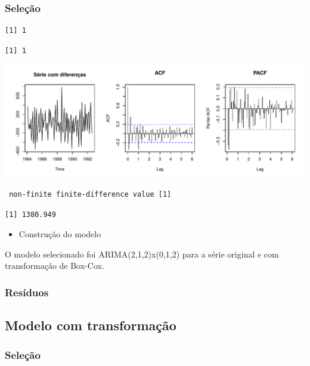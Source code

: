 \documentclass[
  letterpaper,
  DIV=11,
  numbers=noendperiod]{scrartcl}
\providecommand{\tightlist}{%
  \setlength{\itemsep}{0pt}\setlength{\parskip}{0pt}}\usepackage{longtable,booktabs,array}
\begin{document}
\hypertarget{seleuxe7uxe3o}{%
\subsubsection{Seleção}\label{seleuxe7uxe3o}}

\begin{verbatim}
[1] 1
\end{verbatim}

\begin{verbatim}
[1] 1
\end{verbatim}

\includegraphics{T2_grupo5_files/figure-pdf/acf-pacf-sem-transformacao-1.pdf}

\begin{verbatim}
 non-finite finite-difference value [1] 
\end{verbatim}

\begin{verbatim}
[1] 1380.949
\end{verbatim}

\begin{itemize}
\tightlist
\item
  Construção do modelo
\end{itemize}

O modelo selecionado foi ARIMA(2,1,2)x(0,1,2) para a série original e
com transformação de Box-Cox.

\hypertarget{resuxedduos}{%
\subsubsection{Resíduos}\label{resuxedduos}}

\hypertarget{modelo-com-transformauxe7uxe3o}{%
\subsection{Modelo com
transformação}\label{modelo-com-transformauxe7uxe3o}}

\hypertarget{seleuxe7uxe3o-1}{%
\subsubsection{Seleção}\label{seleuxe7uxe3o-1}}
\end{document}
